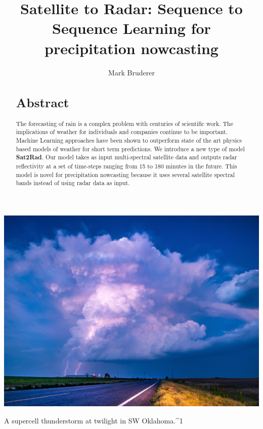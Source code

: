 \documentclass[acmtog, authorversion]{acmart}
\begin{document}
\title{Satellite to Radar: Sequence to Sequence Learning for precipitation nowcasting}

\author{Mark Bruderer}

\renewcommand{\shortauthors}{Mark Bruderer}

\begin{abstract}
\section*{Abstract}
The forecasting of rain is a complex problem with centuries of scientific work. The implications of weather for individuals and companies continue to be important. Machine Learning approaches have been shown to outperform state of the art physics based models of weather for short term predictions. We introduce a new type of model \textbf{Sat2Rad}. Our model takes as input multi-spectral satellite data and outputs radar reflectivity at a set of time-steps ranging from 15 to 180 minutes in the future. This model is novel for precipitation nowcasting because it uses several satellite spectral bands instead of using radar data as input.
\end{abstract}



\begin{teaserfigure}
  \includegraphics*[width=\textwidth, trim= 0in 0.0in 0in 16.0in]{images/lightning.jpg}
  \caption{A supercell thunderstorm at twilight in SW Oklahoma.^1}
  \label{fig:teaser}
\end{teaserfigure}
\end{document}
